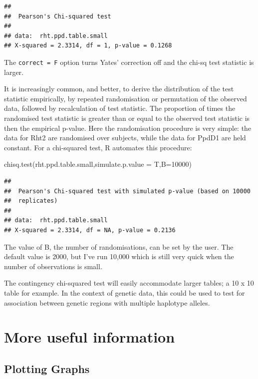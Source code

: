 \documentclass[
]{book}
\newenvironment{Shaded}{\begin{snugshade}}{\end{snugshade}}
\newcommand{\AttributeTok}[1]{\textcolor[rgb]{0.77,0.63,0.00}{#1}}
\newcommand{\DecValTok}[1]{\textcolor[rgb]{0.00,0.00,0.81}{#1}}
\newcommand{\FunctionTok}[1]{\textcolor[rgb]{0.00,0.00,0.00}{#1}}
\newcommand{\NormalTok}[1]{#1}
\begin{document}
\begin{verbatim}
## 
##  Pearson's Chi-squared test
## 
## data:  rht.ppd.table.small
## X-squared = 2.3314, df = 1, p-value = 0.1268
\end{verbatim}

The \texttt{correct\ =\ F} option turns Yates' correction off and the chi-sq test statistic is larger.

It is increasingly common, and better, to derive the distribution of the test statistic empirically, by repeated randomisation or permutation of the observed data, followed by recalculation of test statistic. The proportion of times the randomised test statistic is greater than or equal to the observed test statistic is then the empirical p-value. Here the randomisation procedure is very simple: the data for Rht2 are randomised over subjects, while the data for PpdD1 are held constant. For a chi-squared test, R automates this procedure:

\begin{Shaded}
\begin{Highlighting}[]
\FunctionTok{chisq.test}\NormalTok{(rht.ppd.table.small,}\AttributeTok{simulate.p.value =}\NormalTok{ T,}\AttributeTok{B=}\DecValTok{10000}\NormalTok{)}
\end{Highlighting}
\end{Shaded}

\begin{verbatim}
## 
##  Pearson's Chi-squared test with simulated p-value (based on 10000
##  replicates)
## 
## data:  rht.ppd.table.small
## X-squared = 2.3314, df = NA, p-value = 0.2136
\end{verbatim}

The value of B, the number of randomisations, can be set by the user. The default value is 2000, but I've run 10,000 which is still very quick when the number of observations is small.

The contingency chi-squared test will easily accommodate larger tables; a 10 x 10 table for example. In the context of genetic data, this could be used to test for association between genetic regions with multiple haplotype alleles.

\hypertarget{more-useful-information}{%
\section{More useful information}\label{more-useful-information}}

\hypertarget{plotting-graphs}{%
\subsection{Plotting Graphs}\label{plotting-graphs}}
\end{document}
